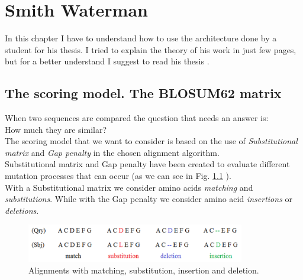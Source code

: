 \chapter{Smith Waterman}
In this chapter I have to understand how to use the architecture done by a student for his thesis. I tried to explain the theory of his work in just few pages, but for a better understand I suggest to read his thesis \cite{SW}.
\section{The scoring model. The BLOSUM62 matrix}
When two sequences are compared the question that needs an answer is:\\How much they are similar?\\
 The scoring model that we want to consider is based on the use of\textit{ Substitutional matrix} and \textit{Gap penalty} in the chosen alignment algorithm.\\Substitutional matrix and Gap penalty have been created to evaluate different mutation processes that can occur (as we can see in Fig. \ref{sw1} ).\\ 
 With a Substitutional matrix we consider amino acids \textit{matching} and \textit{substitutions}. While with the Gap penalty we consider amino acid \textit{insertions} or \textit{deletions}.
               \begin{figure}[h!]
               	\centering
               	\includegraphics[width=0.85\textwidth]{imm/sw/sw1.png} 	\caption{Alignments with matching, substitution, insertion and deletion.
               		} 
               	\label{sw1}
               \end{figure}
 
 
 
